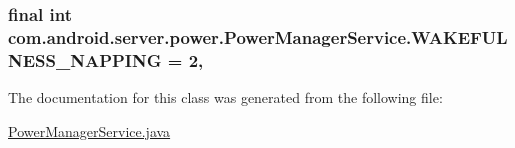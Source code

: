\hypertarget{classcom_1_1android_1_1server_1_1power_1_1PowerManagerService_ae4479c168046860aca26cc4a8c424f06}{
\subsubsection[{W\-A\-K\-E\-F\-U\-L\-N\-E\-S\-S\-\_\-\-N\-A\-P\-P\-I\-N\-G}]{\setlength{\rightskip}{0pt plus 5cm}final int com.\-android.\-server.\-power.\-Power\-Manager\-Service.\-W\-A\-K\-E\-F\-U\-L\-N\-E\-S\-S\-\_\-\-N\-A\-P\-P\-I\-N\-G = 2\hspace{0.3cm}{\ttfamily [static]}, {\ttfamily [private]}}}\label{classcom_1_1android_1_1server_1_1power_1_1PowerManagerService_ae4479c168046860aca26cc4a8c424f06}


The documentation for this class was generated from the following file\-:\begin{DoxyCompactItemize}
\item 
\hyperlink{PowerManagerService_8java}{Power\-Manager\-Service.\-java}\end{DoxyCompactItemize}
